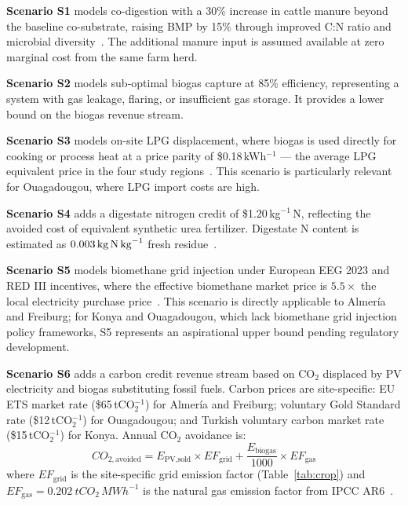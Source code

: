 \textbf{Scenario S1} models co-digestion with a 30\% increase in
cattle manure beyond the baseline co-substrate, raising BMP by 15\%
through improved C:N ratio and microbial
diversity~\citep{pilarski2025}. The additional manure input is
assumed available at zero marginal cost from the same farm herd.

\textbf{Scenario S2} models sub-optimal biogas capture at 85\%
efficiency, representing a system with gas leakage, flaring, or
insufficient gas storage. It provides a lower bound on the biogas
revenue stream.

\textbf{Scenario S3} models on-site LPG displacement, where biogas
is used directly for cooking or process heat at a price parity of
\$0.18\,kWh$^{-1}$ --- the average LPG equivalent price in the four
study regions~\citep{iea2025}. This scenario is particularly
relevant for Ouagadougou, where LPG import costs are high.

\textbf{Scenario S4} adds a digestate nitrogen credit of
\$1.20\,kg$^{-1}$\,N, reflecting the avoided cost of equivalent
synthetic urea fertilizer. Digestate N content is estimated as
$0.003\,\text{kg\,N}\,\text{kg}^{-1}$ fresh
residue~\citep{lallement2023}.

\textbf{Scenario S5} models biomethane grid injection under European
EEG 2023 and RED III incentives, where the effective biomethane
market price is $5.5\times$ the local electricity purchase
price~\citep{nikzad2026, eba2025, rabobank2025}. This scenario is
directly applicable to Almer\'{i}a and Freiburg; for Konya and
Ouagadougou, which lack biomethane grid injection policy frameworks,
S5 represents an aspirational upper bound pending regulatory
development.

\textbf{Scenario S6} adds a carbon credit revenue stream based on
CO$_2$ displaced by PV electricity and biogas substituting fossil
fuels. Carbon prices are site-specific: EU ETS market rate
(\$65\,tCO$_2^{-1}$) for Almer\'{i}a and Freiburg; voluntary Gold
Standard rate (\$12\,tCO$_2^{-1}$) for Ouagadougou; and Turkish
voluntary carbon market rate (\$15\,tCO$_2^{-1}$) for Konya.
Annual CO$_2$ avoidance is:
\begin{equation}
	CO_{2,\text{avoided}} =
	E_{\text{PV,sold}} \times EF_{\text{grid}}
	+ \frac{E_{\text{biogas}}}{1000}
	\times EF_{\text{gas}}
	\label{eq:co2}
\end{equation}
where $EF_{\text{grid}}$ is the site-specific grid emission factor
(Table~\ref{tab:crop}) and $EF_{\text{gas}} =
\SI{0.202}{tCO_2\,MWh^{-1}}$ is the natural gas emission factor
from IPCC AR6~\citep{ipcc2022}.
